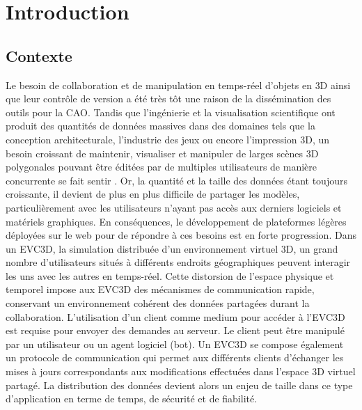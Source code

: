 \chapter{Introduction}
\chaptertable
\section{Contexte}
Le besoin de collaboration et de manipulation en temps-réel d'objets en \gls{3D} 
ainsi que leur contrôle de version a été très tôt une raison de la dissémination des 
outils pour la \gls{CAO}. Tandis que l'ingénierie et la visualisation scientifique ont 
produit des quantités de données massives dans des domaines tels que la 
conception architecturale, l'industrie des jeux ou encore l'impression \gls{3D}, un 
besoin croissant de maintenir, visualiser et manipuler de larges scènes \gls{3D} 
polygonales pouvant être éditées par de multiples utilisateurs de manière 
concurrente se fait sentir \cite{Chandrasegaran2013,Wu2014}. Or, la quantité et la taille des données 
étant toujours croissante, il devient de plus en plus difficile de partager les 
modèles, particulièrement avec les utilisateurs n'ayant pas accès aux derniers 
logiciels et matériels graphiques. En conséquences,
le développement de plateformes légères déployées sur le web pour de répondre à ces 
besoins est en forte progression. 
Dans un \gls{EVC3D}, la simulation distribuée d'un environnement virtuel 3D, un 
grand nombre d'utilisateurs situés à différents endroits géographiques peuvent 
interagir les uns avec les autres en temps-réel. 
Cette distorsion de l'espace physique et temporel impose aux \gls{EVC3D} des 
mécanismes de communication rapide, conservant un environnement cohérent
des données partagées durant la collaboration. 
L'utilisation d'un client comme medium pour 
accéder à l'\gls{EVC3D} est requise pour envoyer des demandes au serveur. Le 
client peut être manipulé par un utilisateur ou un agent logiciel (bot).
Un \gls{EVC3D} se compose également un protocole de communication qui 
permet aux différents clients d'échanger les mises à jours correspondants aux 
modifications effectuées dans l'espace 3D virtuel partagé. La distribution des 
données devient alors un enjeu de taille dans ce type d'application en terme de 
temps, de sécurité et de fiabilité. 





